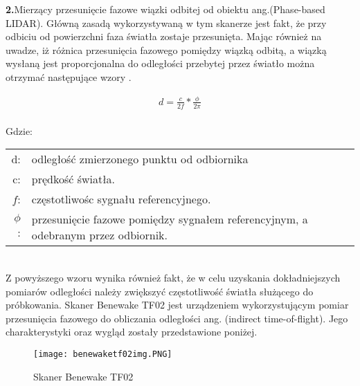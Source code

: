 \documentclass[10pt,twoside]{article}
\begin{document}
\textbf{2.}Mierzący przesunięcie fazowe wiązki odbitej od obiektu ang.(Phase-based LIDAR). Główną zasadą wykorzystywaną w tym skanerze jest fakt, że przy odbiciu od powierzchni faza światła zostaje przesunięta. Mając również na uwadze, iż różnica przesunięcia fazowego pomiędzy wiązką odbitą, a wiązką wysłaną jest proporcjonalna do odległości przebytej przez światło można otrzymać następujące wzory \cite{articleLidar}.

\begin{equation}
    \begin{aligned}
       d=\frac{c}{2f}* \frac{\phi}{2\pi}\\
    \end{aligned}
\end{equation}

Gdzie:\\

\hspace*{3em}
\begin{tabular}{rl}
    d:& odległość zmierzonego punktu od odbiornika \\
    c:& prędkość światła. \\
    $f$:& częstotliwośc sygnału referencyjnego. \\
    $\phi$:& przesunięcie fazowe pomiędzy sygnałem referencyjnym, a odebranym przez odbiornik. \\
\end{tabular}\\
Z powyższego wzoru wynika również fakt, że w celu uzyskania dokładniejszych pomiarów odległości należy zwiększyć częstotliwość światła służącego do próbkowania.\newline
\newline
Skaner Benewake TF02 jest urządzeniem wykorzystującym pomiar przesunięcia fazowego do obliczania odległości ang. (indirect time-of-flight). Jego charakterystyki oraz wygląd zostały przedstawione poniżej.

\begin{figure}[H]
  \centering
  \texttt{[image: benewaketf02img.PNG]}
  \caption{Skaner Benewake TF02}   
  \label{fig:picture}
\end{figure}
\end{document}
